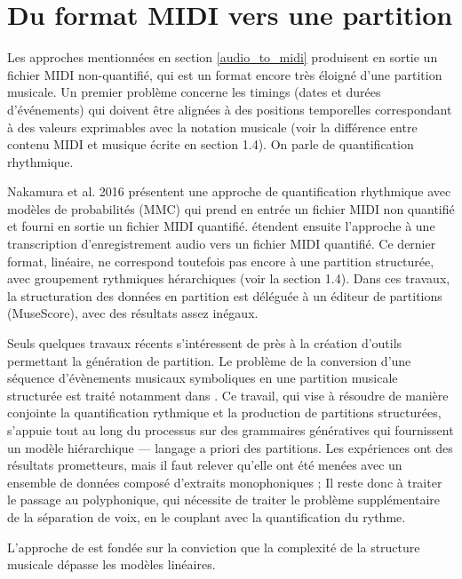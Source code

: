 \section{Du format MIDI vers une partition}
Les approches mentionnées en section \ref{audio_to_midi} produisent en sortie
un fichier MIDI non-quantifié, qui est un format encore très éloigné d'une
partition musicale. Un premier problème concerne les timings (dates et durées
d'événements) qui doivent être alignées à des positions temporelles
correspondant à des valeurs exprimables avec la notation musicale (voir la
différence entre contenu MIDI et musique écrite en section 1.4). On parle de
quantification rhythmique.

Nakamura et al. 2016 présentent une approche de quantification rhythmique avec
modèles de probabilités (MMC) qui prend en entrée un fichier MIDI non quantifié
et fourni en sortie un fichier MIDI quantifié. \cite{SHIBATA2021262} étendent
ensuite l'approche à une transcription d'enregistrement audio vers un fichier
MIDI quantifié. Ce dernier format, linéaire, ne correspond toutefois pas encore
à une partition structurée,  avec groupement rythmiques hérarchiques (voir la
section 1.4). Dans ces travaux, la structuration des données en partition est
déléguée à un éditeur de partitions (MuseScore), avec des résultats assez
inégaux.

Seuls quelques travaux récents s’intéressent de près à la création d’outils
permettant la génération de partition. Le problème de la conversion d'une
séquence d'évènements musicaux symboliques en une partition musicale structurée
est traité notamment dans \cite{foscarin:hal-01988990}. Ce travail, qui vise à
résoudre de manière conjointe la quantification rythmique et la production de
partitions structurées, s’appuie tout au long du processus sur des grammaires
génératives qui fournissent un modèle hiérarchique — langage a priori des
partitions. Les expériences ont des résultats prometteurs, mais il faut relever
qu’elle ont été menées avec un ensemble de données composé d'extraits
monophoniques ; Il reste donc à traiter le passage au polyphonique, qui
nécessite de traiter le problème supplémentaire de la séparation de voix,
en le couplant avec la quantification du rythme.

L'approche de \cite{foscarin:hal-01988990} est fondée sur la conviction 
que la complexité de la structure musicale dépasse les modèles linéaires.

